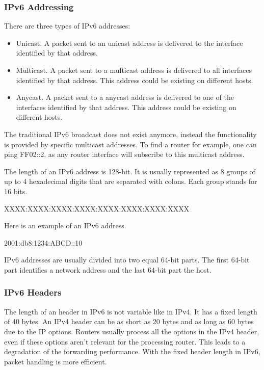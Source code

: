 \documentclass[a4paper]{report}
\begin{document}
\subsubsection{IPv6 Addressing}
\label{sssec:ipv6:addressing}
There are three types of IPv6 addresses:
\begin{itemize}
	\item Unicast. A packet sent to an unicast address is delivered to the interface identified by that address.
	\item Multicast. A packet sent to a multicast address is delivered to all interfaces identified by that address. This address could be existing on different hosts.
	\item Anycast. A packet sent to a anycast address is delivered to one of the interfaces identified by that address. This address could be existing on different hosts.
\end{itemize}
The traditional IPv6 broadcast does not exist anymore, instead the functionality is provided by specific multicast addresses. To find a router for example, one can ping FF02::2, as any router interface will subscribe to this multicast address. \parencite[142-143]{Loshin2004}

The length of an IPv6 address is 128-bit. It is usually represented as 8 groups of up to 4 hexadecimal digits that are separated with colons. Each group stands for 16 bits.
\begin{codebox}
	XXXX:XXXX:XXXX:XXXX:XXXX:XXXX:XXXX:XXXX
\end{codebox}
Here is an example of an IPv6 address.
\begin{codebox}
	2001:db8:1234:ABCD::10
\end{codebox}
IPv6 addresses are usually divided into two equal 64-bit parts. The first 64-bit part identifies a network address and the last 64-bit part the host. \parencite[144-146]{Loshin2004}
 
\subsubsection{IPv6 Headers}
\label{sssec:ipv6:headers}
The length of an header in IPv6 is not variable like in IPv4. It has a fixed length of 40 bytes. An IPv4 header can be as short as 20 bytes and as long as 60 bytes due to the IP options. Routers usually process all the options in the IPv4 header, even if these options aren't relevant for the processing router. This leads to a degradation of the forwarding performance.  With the fixed header length in IPv6, packet handling is more efficient. \parencite[128]{Loshin2004}
\end{document}
